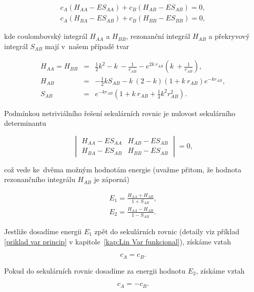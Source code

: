 \begin{eqnarray}
c_A (H_{AA} - E S_{AA}) + c_B (H_{AB} - E S_{AB}) = 0, \nonumber \\
c_A (H_{BA} - E S_{AB}) + c_B (H_{BB} - E S_{BB}) = 0,
\label{rov:ElStrukt-6}
\end{eqnarray}

\noindent kde coulombovský integrál $H_{AA}$ a $H_{BB}$, rezonanční integrál $H_{AB}$ a překryvový integrál $S_{AB}$ mají v~našem případě tvar

\begin{eqnarray}
H_{AA} = H_{BB} &=& \frac{1}{2} k^2 - k~- \frac{1}{r_{AB}} - e^{2 k~r_{AB}} \left( k~+ \frac{1}{r_{AB}} \right), \nonumber \\
H_{AB} &=& -\frac{1}{2}k S_{AB} - k~(2-k) (1+ k~r_{AB}) e^{-k r_{AB}}, \nonumber \\
S_{AB} &=& e^{-k r_{AB}} \left(1 + k~r_{AB} + \frac{1}{3}k^2 r_{AB}^2 \right).
\label{rov:ElStrukt-7}
\end{eqnarray}

Podmínkou netriviálního řešení sekulárních rovnic je nulovost sekulárního determinantu


\begin{equation}
\begin{vmatrix}
H_{AA} - E S_{AA} & H_{AB} - E S_{AB}\\
H_{BA} - E S_{AB} & H_{BB} - E S_{AB}
\end{vmatrix}
=0,
\label{rov:ElStrukt-8}
\end{equation}

\noindent což vede ke~dvěma možným hodnotám energie (uvažme přitom, že hodnota rezonančního integrálu $H_{AB}$ je záporná)

\begin{eqnarray}
E_1 = \frac{H_{AA} + H_{AB}}{1+S_{AB}}, \nonumber \\
E_2 = \frac{H_{AA} - H_{AB}}{1-S_{AB}}.
\label{rov:ElStrukt-9}
\end{eqnarray}

Jestliže dosadíme energii $E_1$ zpět do sekulárních rovnic (detaily viz příklad \ref{priklad var princip} v kapitole~\ref{kap:Lin Var funkcional}), získáme vztah 

\begin{equation}
c_A = c_B.
\label{rov:ElStrukt-10}
\end{equation}

Pokud do sekulárních rovnic  dosadíme za energii hodnotu $E_2$, získáme vztah

\begin{equation}
c_A = - c_B.
\label{rov:ElStrukt-11}
\end{equation}


